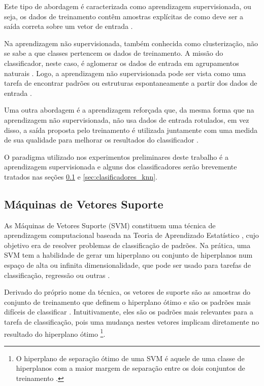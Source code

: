 Este tipo de abordagem é caracterizada como aprendizagem supervisionada, ou seja, os dados de treinamento contêm amostras explícitas de como deve ser a saída correta sobre um vetor de entrada \citep{mostafa:12}.

Na aprendizagem não supervisionada, também conhecida como clusterização, não se sabe a que classes pertencem os dados de treinamento. A missão do classificador, neste caso, é aglomerar os dados de entrada em agrupamentos naturais \citep{duda:12}. Logo, a aprendizagem não supervisionada pode ser vista como uma tarefa de encontrar padrões ou estruturas espontaneamente a partir dos dados de entrada \citep{mostafa:12}.

Uma outra abordagem é a aprendizagem reforçada que, da mesma forma que na aprendizagem não supervisionada, não usa dados de entrada rotulados, em vez disso, a saída proposta pelo treinamento é utilizada juntamente com uma medida de sua qualidade para melhorar os resultados do classificador \citep{mostafa:12}.

O paradigma utilizado nos experimentos preliminares deste trabalho é a aprendizagem supervisionada e alguns dos classificadores serão brevemente tratados nas seções \ref{sec:clasificadores_svm} e \ref{sec:clasificadores_knn}.


\subsection{Máquinas de Vetores Suporte}
\label{sec:clasificadores_svm}
As Máquinas de Vetores Suporte (SVM) constituem uma técnica de aprendizagem computacional baseada na Teoria de Aprendizado Estatístico \citep{vapnik:13}, cujo objetivo era de resolver problemas de classificação de padrões. Na prática, uma SVM tem a habilidade de gerar um hiperplano ou conjunto de hiperplanos num espaço de alta ou infinita dimensionalidade, que pode ser usado para tarefas de classificação, regressão ou outras \citep{duda:12}.

Derivado do próprio nome da técnica, os vetores de suporte são as amostras do conjunto de treinamento que definem o hiperplano ótimo e são os padrões mais difíceis de classificar \citep{duda:12}. Intuitivamente, eles são os padrões mais relevantes para a tarefa de classificação, pois uma mudança nestes vetores implicam diretamente no resultado do hiperplano ótimo \footnote{O hiperplano de separação ótimo de uma SVM é aquele de uma classe de hiperplanos com a maior margem de separação entre os dois conjuntos de treinamento \citep{cortes:95}.}.


